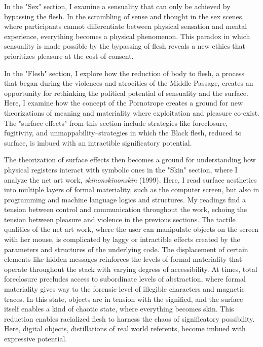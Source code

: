 \documentclass[11pt]{article}
\begin{document}
\begin{enumerate}
In the "Sex" section, I examine a sensuality that can only be achieved
by bypassing the flesh. In the scrambling of sense and thought in the
sex scenes, where participants cannot differentiate between physical
sensation and mental experience, everything becomes a physical
phenomenon. This paradox in which sensuality is made possible by the
bypassing of flesh reveals a new ethics that prioritizes pleasure at
the cost of consent.

In the "Flesh" section, I explore how the reduction of body to flesh,
a process that began during the violences and atrocities of the Middle
Passage, creates an opportunity for rethinking the political potential
of sensuality and the surface. Here, I examine how the concept of the
Pornotrope creates a ground for new theorizations of meaning and
materiality where exploitation and pleasure co-exist. The "surface
effects" from this section include strategies like foreclosure,
fugitivity, and unmappability--strategies in which the Black flesh,
reduced to surface, is imbued with an intractible significatory
potential.

The theorization of surface effects then becomes a ground for
understanding how physical registers interact with symbolic ones in
the "Skin" section, where I analyze the net art work,
\emph{skinonskinonskin} (1999). Here, I read surface aesthetics into
multiple layers of formal materiality, such as the computer screen,
but also in programming and machine language logics and structures. My
readings find a tension between control and communication throughout
the work, echoing the tension between pleasure and violence in the
previous sections. The tactile qualities of the net art work, where
the user can manipulate objects on the screen with her mouse, is
complicated by laggy or intractible effects created by the parameters
and structures of the underlying code. The displacement of certain
elements like hidden messages reinforces the levels of formal
materiality that operate throughout the stack with varying degress of
accessibility. At times, total foreclosure precludes access to
subordinate levels of abstraction, where formal materiality gives way
to the forensic level of illegible characters and magnetic traces. In
this state, objects are in tension with the signified, and the surface
itself enables a kind of chaotic state, where everything becomes
skin. This reduction enables racialized flesh to harness the chaos of
significatory possibility. Here, digital objects, distillations of
real world referents, become imbued with expressive potential.
\end{enumerate}
\end{document}
